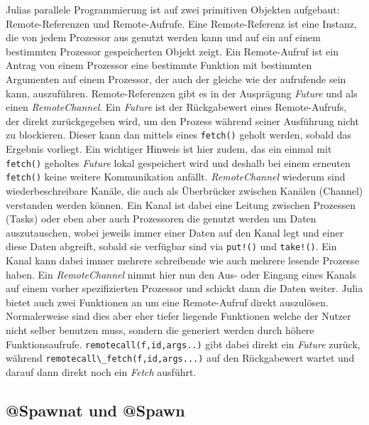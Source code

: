 \documentclass[proseminar,german,utf8]{zihpub}
\begin{document}
Julias parallele Programmierung ist auf zwei primitiven Objekten aufgebaut: Remote-Referenzen und Remote-Aufrufe. Eine Remote-Referenz ist eine Instanz, die von jedem Prozessor aus genutzt werden kann und auf ein auf einem bestimmten Prozessor gespeicherten Objekt zeigt. Ein Remote-Aufruf ist ein Antrag von einem Prozessor eine bestimmte Funktion mit bestimmten Argumenten auf einem Prozessor, der auch der gleiche wie der aufrufende sein kann, auszuführen. Remote-Referenzen gibt es in der Ausprägung \textit{Future} und als einen \textit{RemoteChannel}. Ein \textit{Future} ist der Rückgabewert eines Remote-Aufrufs, der direkt zurückgegeben wird, um den Prozess während seiner Ausführung nicht zu blockieren. Dieser kann dan mittels eines \verb|fetch()| geholt werden, sobald das Ergebnis vorliegt. Ein wichtiger Hinweis ist hier zudem, das ein einmal mit \verb|fetch()| geholtes \textit{Future} lokal gespeichert wird und deshalb bei einem erneuten \verb|fetch()| keine weitere Kommunikation anfällt. \textit{RemoteChannel} wiederum sind wiederbeschreibare Kanäle, die auch als Überbrücker zwischen Kanälen (Channel) verstanden werden können. Ein Kanal ist dabei eine Leitung zwischen Prozessen (Tasks) oder eben aber auch Prozessoren die genutzt werden um Daten auszutauschen, wobei jeweils immer einer Daten auf den Kanal legt und einer diese Daten abgreift, sobald sie verfügbar sind via \verb|put!()| und \verb|take!()|. Ein Kanal kann dabei immer mehrere schreibende wie auch mehrere lesende Prozesse haben. Ein \textit{RemoteChannel} nimmt hier nun den Aus- oder Eingang eines Kanals auf einem vorher spezifizierten Prozessor und schickt dann die Daten weiter. Julia bietet auch zwei Funktionen an um eine Remote-Aufruf direkt auszulösen. Normalerweise sind dies aber eher tiefer liegende Funktionen welche der Nutzer nicht selber benutzen muss, sondern die generiert werden durch höhere Funktionsaufrufe. \verb|remotecall(f,id,args..)| gibt dabei direkt ein \textit{Future} zurück, während \verb|remotecall\_fetch(f,id,args...)| auf den Rückgabewert wartet und darauf dann direkt noch ein \textit{Fetch} ausführt.~\cite{JuliaLangDocumentation}

\subsection{@Spawnat und @Spawn}
\end{document}
